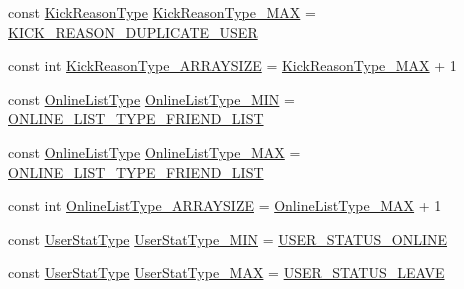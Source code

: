 \begin{DoxyCompactItemize}
\item 
const \hyperlink{namespace_i_m_1_1_base_define_a7ac3ce0aff5b2d7dec30a6876d9e6b75}{Kick\+Reason\+Type} \hyperlink{namespace_i_m_1_1_base_define_a8f4f2c00daf5f0f62d9946a792c5d196}{Kick\+Reason\+Type\+\_\+\+M\+A\+X} = \hyperlink{namespace_i_m_1_1_base_define_a7ac3ce0aff5b2d7dec30a6876d9e6b75a6182a8a201db91eb853c68757a602b8e}{K\+I\+C\+K\+\_\+\+R\+E\+A\+S\+O\+N\+\_\+\+D\+U\+P\+L\+I\+C\+A\+T\+E\+\_\+\+U\+S\+E\+R}
\item 
const int \hyperlink{namespace_i_m_1_1_base_define_a7124be38d887e18d12368df806228a2c}{Kick\+Reason\+Type\+\_\+\+A\+R\+R\+A\+Y\+S\+I\+Z\+E} = \hyperlink{namespace_i_m_1_1_base_define_a8f4f2c00daf5f0f62d9946a792c5d196}{Kick\+Reason\+Type\+\_\+\+M\+A\+X} + 1
\item 
const \hyperlink{namespace_i_m_1_1_base_define_aec94260a9c0d1eae6f84ff6e7a5f669c}{Online\+List\+Type} \hyperlink{namespace_i_m_1_1_base_define_a5bae77687196a1b8e2aa7c5077518f48}{Online\+List\+Type\+\_\+\+M\+I\+N} = \hyperlink{namespace_i_m_1_1_base_define_aec94260a9c0d1eae6f84ff6e7a5f669ca6a64165472b6852e517fde27f17d0c6f}{O\+N\+L\+I\+N\+E\+\_\+\+L\+I\+S\+T\+\_\+\+T\+Y\+P\+E\+\_\+\+F\+R\+I\+E\+N\+D\+\_\+\+L\+I\+S\+T}
\item 
const \hyperlink{namespace_i_m_1_1_base_define_aec94260a9c0d1eae6f84ff6e7a5f669c}{Online\+List\+Type} \hyperlink{namespace_i_m_1_1_base_define_a63801ce142760a78b686e796fc8fafe7}{Online\+List\+Type\+\_\+\+M\+A\+X} = \hyperlink{namespace_i_m_1_1_base_define_aec94260a9c0d1eae6f84ff6e7a5f669ca6a64165472b6852e517fde27f17d0c6f}{O\+N\+L\+I\+N\+E\+\_\+\+L\+I\+S\+T\+\_\+\+T\+Y\+P\+E\+\_\+\+F\+R\+I\+E\+N\+D\+\_\+\+L\+I\+S\+T}
\item 
const int \hyperlink{namespace_i_m_1_1_base_define_abb407bfc5f7c031b27a242cc7f04d7f7}{Online\+List\+Type\+\_\+\+A\+R\+R\+A\+Y\+S\+I\+Z\+E} = \hyperlink{namespace_i_m_1_1_base_define_a63801ce142760a78b686e796fc8fafe7}{Online\+List\+Type\+\_\+\+M\+A\+X} + 1
\item 
const \hyperlink{namespace_i_m_1_1_base_define_adaf1a78b7a7db0195b92cc1786d93c01}{User\+Stat\+Type} \hyperlink{namespace_i_m_1_1_base_define_a2b239926a33b1c16504caa2f6493b01b}{User\+Stat\+Type\+\_\+\+M\+I\+N} = \hyperlink{namespace_i_m_1_1_base_define_adaf1a78b7a7db0195b92cc1786d93c01a5541719e44e84a910843a73d5e452ba5}{U\+S\+E\+R\+\_\+\+S\+T\+A\+T\+U\+S\+\_\+\+O\+N\+L\+I\+N\+E}
\item 
const \hyperlink{namespace_i_m_1_1_base_define_adaf1a78b7a7db0195b92cc1786d93c01}{User\+Stat\+Type} \hyperlink{namespace_i_m_1_1_base_define_ae1f01f6be0b89d484aaf18cd5165a849}{User\+Stat\+Type\+\_\+\+M\+A\+X} = \hyperlink{namespace_i_m_1_1_base_define_adaf1a78b7a7db0195b92cc1786d93c01a0e6f233ef7c0e0763332a65efd55aa53}{U\+S\+E\+R\+\_\+\+S\+T\+A\+T\+U\+S\+\_\+\+L\+E\+A\+V\+E}

\end{DoxyCompactItemize}

